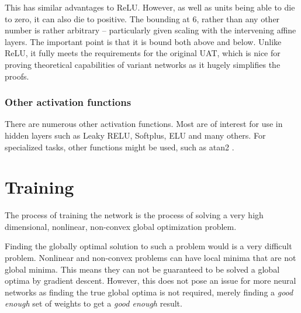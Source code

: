 \documentclass[12pt,parskip]{komatufte}\right
\begin{document}
This has similar advantages to ReLU.
However, as well as units being able to die to zero, it can also die to positive.
The bounding at 6, rather than any other number is rather arbitrary -- particularly given scaling with the intervening affine layers.
The important point is that it is bound both above and below.
Unlike ReLU, it fully meets the requirements for the original UAT, which is nice for proving theoretical capabilities of variant networks as it hugely simplifies the proofs.



\subsubsection{Other activation functions}

There are numerous other activation functions.
Most are of interest for use in hidden layers such as Leaky RELU, Softplus, ELU and many others.
For specialized tasks, other functions might be used, such as atan2 .


\section{Training}
The process of training the network is the process of solving a very high dimensional, nonlinear, non-convex global optimization problem.


Finding the globally optimal solution to such a problem would is a very difficult problem.
Nonlinear and non-convex problems can have local minima that are not global minima.
This means they can not be guaranteed to be solved  a global optima by gradient descent.
However, this does not pose an issue for more neural networks as finding the true global optima is not required, merely finding a \emph{good enough} set of weights to get a \emph{good enough} result.
\end{document}
